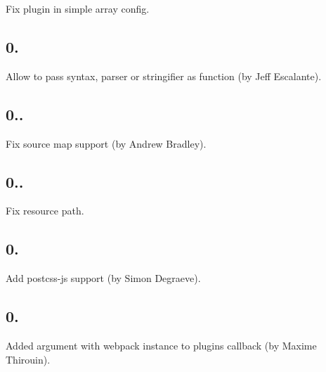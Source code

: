 \begin{DoxyItemize}
\item Fix plugin in simple array config.
\end{DoxyItemize}

\subsection*{0.}


\begin{DoxyItemize}
\item Allow to pass syntax, parser or stringifier as function (by Jeff Escalante).
\end{DoxyItemize}

\subsection*{0..}


\begin{DoxyItemize}
\item Fix source map support (by Andrew Bradley).
\end{DoxyItemize}

\subsection*{0..}


\begin{DoxyItemize}
\item Fix resource path.
\end{DoxyItemize}

\subsection*{0.}


\begin{DoxyItemize}
\item Add postcss-\/js support (by Simon Degraeve).
\end{DoxyItemize}

\subsection*{0.}


\begin{DoxyItemize}
\item Added argument with webpack instance to plugins callback (by Maxime Thirouin).
\end{DoxyItemize}

